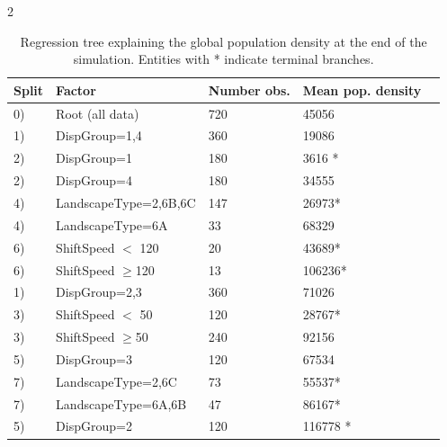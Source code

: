 \documentclass[12pt,pdftex]{article}
\begin{document}
\begin{spacing}{2}
\begin{table}
\begin{tabular}{lllll}
\hline
{\bf Split}										&{\bf Factor} 						&{\bf Number obs.} 			&{\bf Mean pop. density} 	\\ %
\hline
\hline
\hspace{0.00cm}	0)						&Root 	(all data)				&720 							 	&45056 \\ 	%
\hspace{0.4cm}   1) 							&DispGroup=1,4 				&360 							  	&19086\\ 	%
 \hspace{0.8cm}    2) 						&DispGroup=1 				&180 					   			&3616 *\\		%
   \hspace{0.8cm}  2) 						&DispGroup=4 				&180 							 	&34555\\	%
  \hspace{1.6cm}    4) 						&LandscapeType=2,6B,6C 		&147 							 	&26973*\\	%
   \hspace{1.6cm}	4) 						&LandscapeType=6A 			&33 								 	&68329\\	%
     \hspace{2.4cm}   6) 						&ShiftSpeed $<$ 120 			&20 								  	&43689*\\	%
        \hspace{2.4cm}	6) 					&ShiftSpeed $\geq$120 			&13 								 	&106236*\\	%
\hspace{0.4cm}   1) 							&DispGroup=2,3 				&360 							  	&71026 \\	%
 \hspace{1.2cm}    3) 						&ShiftSpeed $<$ 50 				&120 							  	&28767*\\	%
   \hspace{1.2cm}  3) 						&ShiftSpeed $\geq$50 			&240 							  	&92156 \\	%
     \hspace{2.0cm} 5) 						&DispGroup=3 				&120 							  	&67534 \\	%
   \hspace{2.8cm}     7)						&LandscapeType=2,6C 			&73 								  	&55537*\\	%
       \hspace{2.8cm} 7)						&LandscapeType=6A,6B 			&47 								 	&86167*\\	%
     \hspace{2.0cm} 5) 						&DispGroup=2 				&120 							 	&116778 *\\	%
\hline
\end{tabular}
\caption{Regression tree explaining the global population density at the end of the simulation. Entities with * indicate terminal branches. }
\end{table}



\end{spacing}
\end{document}
